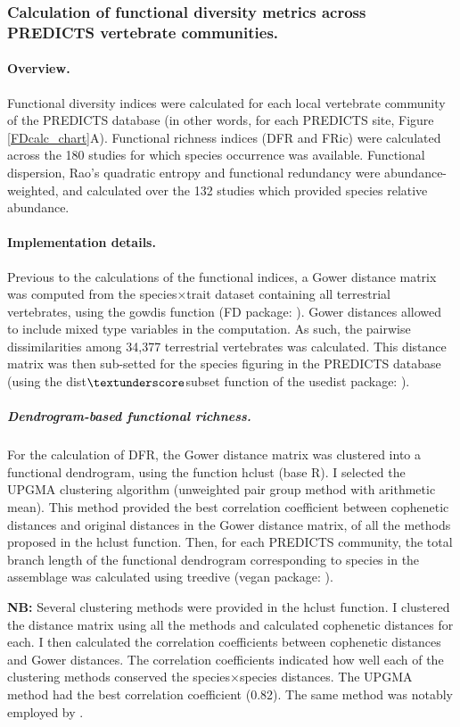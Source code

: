 \subsubsection{Calculation of functional diversity metrics across PREDICTS vertebrate communities.}

\paragraph{Overview.}
Functional diversity indices were calculated for each local vertebrate community of the PREDICTS database (in other words, for each PREDICTS site, Figure  \ref{FDcalc_chart}A). Functional richness indices (DFR and FRic) were calculated across the 180 studies for which species occurrence was available. Functional dispersion, Rao's quadratic entropy and functional redundancy were abundance-weighted, and calculated over the 132 studies which provided species relative abundance.
 
\paragraph{Implementation details.}
Previous to the calculations of the functional indices, a Gower distance matrix was computed from the species$\times$trait dataset containing all terrestrial vertebrates, using the gowdis function (FD package: \citet{Laliberte2010, Laliberte2015}). Gower distances allowed to include mixed type variables in the computation. As such, the pairwise dissimilarities among 34,377 terrestrial vertebrates was calculated. This distance matrix was then sub-setted for the species figuring in the PREDICTS database (using the dist$\textunderscore$subset function of the usedist package: \citet{usedist}).

\subparagraph{Dendrogram-based functional richness.} For the calculation of DFR, the Gower distance matrix was clustered into a functional dendrogram, using the function hclust (base R). I selected the UPGMA clustering algorithm (unweighted pair group method with arithmetic mean). This method provided the best correlation coefficient between cophenetic distances and original distances in the Gower distance matrix, of all the methods proposed in the hclust function. Then, for each PREDICTS community, the total branch length of the functional dendrogram corresponding to species in the assemblage was calculated using treedive (vegan package: \citet{vegan}). 

\textbf{NB:} Several clustering methods were provided in the hclust function. I clustered the distance matrix using all the methods and calculated cophenetic distances for each. I then calculated the correlation coefficients between cophenetic distances and Gower distances. The correlation coefficients indicated how well each of the clustering methods conserved the species$\times$species distances. The UPGMA method had the best correlation coefficient (0.82). The same method was notably employed by \citet{Flynn2009}.

